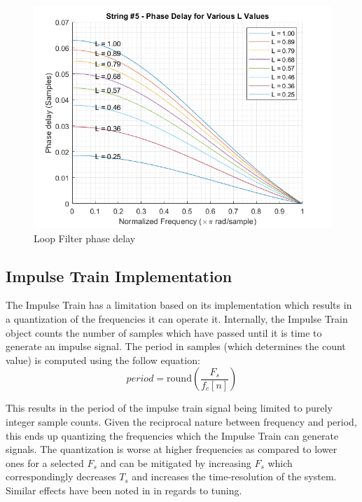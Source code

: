\documentclass[../main.tex]{subfiles}
\begin{document}
\begin{figure}[h]
    \centering
    \includegraphics[scale=.65]{./images/plots/String 5 - Phase Delays.png}
    \caption{Loop Filter phase delay}
    \label{fig:Str5PhaseDelays}
\end{figure}

\subsection{Impulse Train Implementation}
The Impulse Train has a limitation based on its implementation which results in a quantization of the frequencies it can operate it. Internally, the Impulse Train object counts the number of samples which have passed until it is time to generate an impulse signal. The period in samples (which determines the count value) is computed using the follow equation:
\begin{equation}
    period = \text{round}\left(\frac{F_s}{f_c[n]}\right)
    \label{eq:f_cQuantization}
\end{equation}

This results in the period of the impulse train signal being limited to purely integer sample counts. Given the reciprocal nature between frequency and period, this ends up quantizing the frequencies which the Impulse Train can generate signals. The quantization is worse at higher frequencies as compared to lower ones for a selected $F_s$ and can be mitigated by increasing $F_s$ which correspondingly decreases $T_s$ and increases the time-resolution of the system. Similar effects have been noted in  in regards to tuning.
\end{document}
